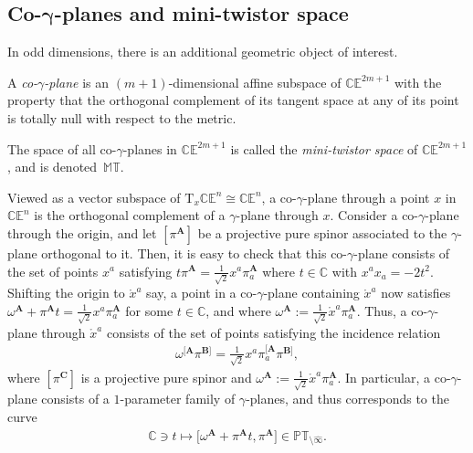 \documentclass[pdftex]{sigma}
\numberwithin{equation}{section}
\newcommand{\mbf} [1]{\mathbf{#1}}
\newcommand{\mr}[1] {\mathring{#1}}
\newcommand{\Tgt} {\mathrm{T}}
\newcommand{\PT} {\mathbb{PT}}
\newcommand{\T} {\mathbb{T}}
\newcommand{\E} {\mathbb{E}}
\newcommand{\M} {\mathbb{M}}
\newcommand{\C} {\mathbb{C}}
\begin{document}
\subsection[Co-gamma-planes and mini-twistor space]{Co-$\boldsymbol{\gamma}$-planes and mini-twistor space}\label{sec-co-gam}
In odd dimensions, there is an additional geometric object of interest.
\begin{Definition}\label{defn-co-null-plane}
A \emph{co-$\gamma$-plane} is an $(m+1)$-dimensional af\/f\/ine subspace of $\C\E^{2m+1}$ with the property that the orthogonal complement of its tangent space at any of its point is totally null with respect to the metric.

The space of all co-$\gamma$-planes in $\C\E^{2m+1}$ is called the \emph{mini-twistor space} of $\C\E^{2m+1}$, and is denoted~$\M\T$.
\end{Definition}

Viewed as a vector subspace of $\Tgt_x \C \E^n \cong \C \E^n$, a co-$\gamma$-plane through a point $x$ in $\C \E^n$ is the orthogonal complement of a $\gamma$-plane through $x$. Consider a co-$\gamma$-plane through the origin, and let $[\pi^{\mbf{A}}]$ be a projective pure spinor associated to the $\gamma$-plane orthogonal to it. Then, it is easy to check that this co-$\gamma$-plane consists of the set of points $x^a$ satisfying $t \pi^{\mbf{A}} = \frac{1}{\sqrt{2}} x^a \pi_a^{\mbf{A}}$ where $t \in \C$ with $x^a x_a = -2 t^2$. Shifting the origin to $\mr{x}^a$ say, a point in a co-$\gamma$-plane containing $\mr{x}^a$ now satisf\/ies $\omega^{\mbf{A}} + \pi^{\mbf{A}} t = \frac{1}{\sqrt{2}} x^a \pi_a^{\mbf{A}}$ for some $t \in \C$, and where $\omega^{\mbf{A}} := \frac{1}{\sqrt{2}} \mr{x}^a \pi_a^{\mbf{A}}$. Thus, a co-$\gamma$-plane through $\mr{x}^a$ consists of the set of points satisfying the incidence relation
\begin{gather}\label{eq-incidence-co-null}
\omega^{[\mbf{A}} \pi^{\mbf{B}]} = \tfrac{1}{\sqrt{2}} x^a \pi_a^{[\mbf{A}} \pi^{\mbf{B}]} ,
\end{gather}
where $[\pi^{\mbf{C}}]$ is a projective pure spinor and $\omega^{\mbf{A}} := \frac{1}{\sqrt{2}} \mr{x}^a \pi_a^{\mbf{A}}$. In particular, a co-$\gamma$-plane consists of a $1$-parameter family of $\gamma$-planes, and thus corresponds to the curve
\begin{gather}\label{eq-MT-PT-curve}
\C \ni t \mapsto \big[\omega^{\mbf{A}} + \pi^{\mbf{A}} t , \pi^{\mbf{A}} \big] \in \PT_{\setminus \widehat{\infty}} .
\end{gather}
\end{document}
